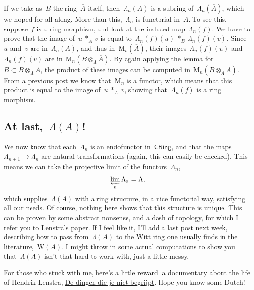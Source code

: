 If we take as~$B$ the ring~$\overline{A}$ itself, then~$\Lambda_{n}(A)$ is a subring of~$\Lambda_{n}(\overline{A})$, which we hoped for all along. More than this,~$\Lambda_{n}$ is functorial in~$A$. To see this, suppose~$f$ is a ring morphism, and look at the induced map~$\Lambda_{n}(f)$. We have to prove that the image of~$u \ *_{A} \ v$ is equal to~$\Lambda_{n}(f)(u) \ *_{B} \ \Lambda_{n}(f)(v)$. Since~$u$ and~$v$ are in~$\Lambda_{n}(A)$, and thus in~$\mathrm{M}_{n}(\overline{A})$, their images~$\Lambda_{n}(f)(u)$ and~$\Lambda_{n}(f)(v)$ are in~$\mathrm{M}_{n}(B \otimes_{A} \overline{A})$. By again applying the lemma for~$B \subset B \otimes_{A} \overline{A}$, the product of these images can be computed in~$\mathrm{M}_{n}(B \otimes_{A} \overline{A})$. From a previous post we know that~$\mathrm{M}_{n}$ is a functor, which means that this product is equal to the image of~$u \ *_{A} \ v$, showing that~$\Lambda_{n}(f)$ is a ring morphism.

\subsection{At last,~$\Lambda(A)$!}

We now know that each~$\Lambda_{n}$ is an endofunctor in~$\textsf{CRing}$, and that the maps~$\Lambda_{n+1} \to \Lambda_{n}$ are natural transformations (again, this can easily be checked). This means we can take the projective limit of the functors~$\Lambda_{n}$,
\begin{equation}
  \varprojlim_{n} \Lambda_{n} = \Lambda,
\end{equation}
which supplies~$\Lambda(A)$ with a ring structure, in a nice functorial way, satisfying all our needs. Of course, nothing here shows that this structure is unique. This can be proven by some abstract nonsense, and a dash of topology, for which I refer you to Lenstra's paper. If I feel like it, I'll add a last post next week, describing how to pass from~$\Lambda(A)$ to the Witt ring one usually finds in the literature,~$\mathrm{W}(A)$. I might throw in some actual computations to show you that~$\Lambda(A)$ isn't that hard to work with, just a little messy.

For those who stuck with me, here's a little reward: a documentary about the life of Hendrik Lenstra, \href{http://www.human.nl/programma-35637-magie-van-de-wetenschap}{De dingen die je niet begrijpt}. Hope you know some Dutch!
